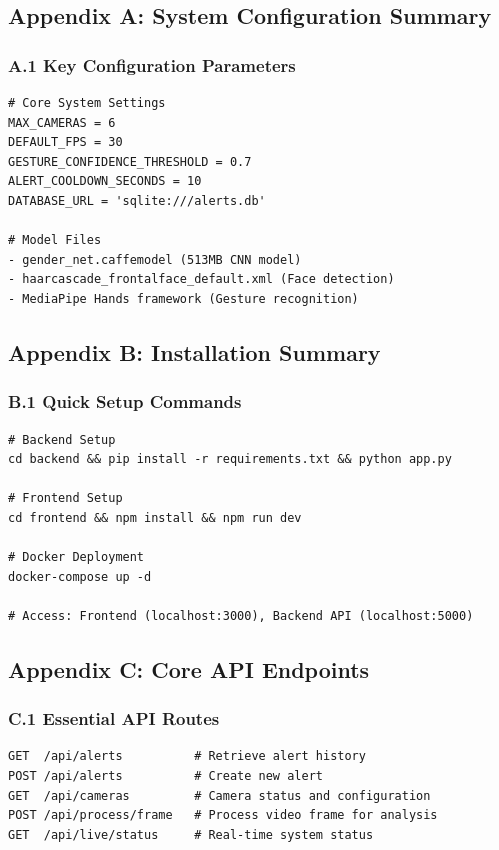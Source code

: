 \documentclass[12pt,a4paper]{article}
\begin{document}
\subsection*{Appendix A: System Configuration Summary}

\subsubsection*{A.1 Key Configuration Parameters}
\begin{verbatim}
# Core System Settings
MAX_CAMERAS = 6
DEFAULT_FPS = 30
GESTURE_CONFIDENCE_THRESHOLD = 0.7
ALERT_COOLDOWN_SECONDS = 10
DATABASE_URL = 'sqlite:///alerts.db'

# Model Files
- gender_net.caffemodel (513MB CNN model)
- haarcascade_frontalface_default.xml (Face detection)
- MediaPipe Hands framework (Gesture recognition)
\end{verbatim}

\subsection*{Appendix B: Installation Summary}

\subsubsection*{B.1 Quick Setup Commands}
\begin{verbatim}
# Backend Setup
cd backend && pip install -r requirements.txt && python app.py

# Frontend Setup
cd frontend && npm install && npm run dev

# Docker Deployment
docker-compose up -d

# Access: Frontend (localhost:3000), Backend API (localhost:5000)
\end{verbatim}

\subsection*{Appendix C: Core API Endpoints}

\subsubsection*{C.1 Essential API Routes}
\begin{verbatim}
GET  /api/alerts          # Retrieve alert history
POST /api/alerts          # Create new alert
GET  /api/cameras         # Camera status and configuration
POST /api/process/frame   # Process video frame for analysis
GET  /api/live/status     # Real-time system status
\end{verbatim}
\end{document}
